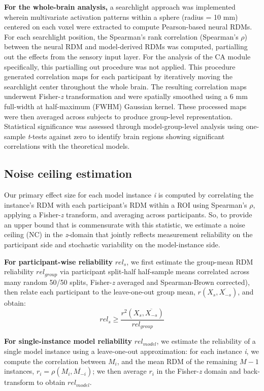 \documentclass[pdflatex,sn-mathphys-num,lineno]{sn-jnl}%
\begin{document}
\begin{CJK}{UTF8}{gbsn}
\textbf{For the whole-brain analysis,} a searchlight approach was implemented wherein multivariate activation patterns within a sphere (radius = 10 mm) centered on each voxel were extracted to compute Pearson-based neural RDMs. For each searchlight position, the Spearman’s rank correlation (Spearman’s $\rho$) between the neural RDM and model-derived RDMs was computed, partialling out the effects from the sensory input layer. For the analysis of the CA module specifically, this partialling out procedure was not applied. This procedure generated correlation maps for each participant by iteratively moving the searchlight center throughout the whole brain. The resulting correlation maps underwent Fisher-\textit{z} transformation and were spatially smoothed using a 6 mm full-width at half-maximum (FWHM) Gaussian kernel. These processed maps were then averaged across subjects to produce group-level representation. Statistical significance was assessed through model-group-level analysis using one-sample \textit{t}-tests against zero to identify brain regions showing significant correlations with the theoretical models.

\subsection{Noise ceiling estimation}
Our primary effect size for each model instance \textit{i} is computed by correlating the instance’s RDM with each participant’s RDM within a ROI using Spearman’s $\rho$, applying a Fisher-\textit{z} transform, and averaging across participants. So, to provide an upper bound that is commensurate with this statistic, we estimate a noise ceiling (NC) in the \textit{z}-domain that jointly reflects measurement reliability on the participant side and stochastic variability on the model-instance side.

\textbf{For participant-wise reliability} $rel_s$, we first estimate the group-mean RDM reliability $rel_{group}$ via participant split-half half-sample means correlated across many random 50/50 splits, Fisher-\textit{z} averaged and Spearman-Brown corrected), then relate each participant to the leave-one-out group mean, $r(X_s, \overline{X_{-s}})$, and obtain:
\[
rel_s \ge \frac{r^2(X_s, \overline{X_{-s}})}{rel_{group}}
\]

\textbf{For single-instance model reliability} $rel_{model}$, we estimate the reliability of a single model instance using a leave-one-out approximation: for each instance \textit{i}, we compute the correlation between $M_i$, and the mean RDM of the remaining $M-1$ instances, $r_i = \rho(M_i, \overline{M_{-i}})$; we then average $r_i$ in the Fisher-\textit{z} domain and back-transform to obtain $rel_{model}$.


\end{CJK}
\end{document}
